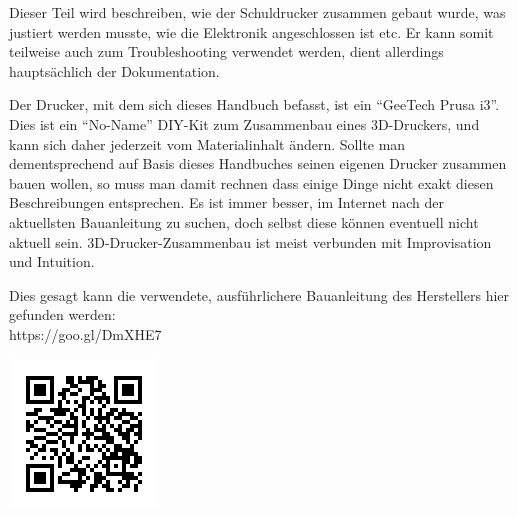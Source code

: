 Dieser Teil wird beschreiben, wie der Schuldrucker zusammen gebaut wurde, was justiert werden musste, wie die Elektronik angeschlossen ist etc.
Er kann somit teilweise auch zum Troubleshooting verwendet werden, dient allerdings hauptsächlich der Dokumentation.

Der Drucker, mit dem sich dieses Handbuch befasst, ist ein "`GeeTech Prusa i3"'. Dies ist ein "`No-Name"' DIY-Kit zum Zusammenbau eines 3D-Druckers, und kann sich daher jederzeit vom Materialinhalt ändern. Sollte man dementsprechend auf Basis dieses Handbuches seinen eigenen Drucker zusammen bauen wollen, so muss man damit rechnen dass einige Dinge nicht exakt diesen Beschreibungen entsprechen. Es ist immer besser, im Internet nach der aktuellsten Bauanleitung zu suchen, doch selbst diese können eventuell nicht aktuell sein. 3D-Drucker-Zusammenbau ist meist verbunden mit Improvisation und Intuition.

Dies gesagt kann die verwendete, ausführlichere Bauanleitung des Herstellers hier gefunden werden:\\
https://goo.gl/DmXHE7
\begin{center}
\includegraphics{Bilder/Anleitung_QRCode.png}
\end{center}


